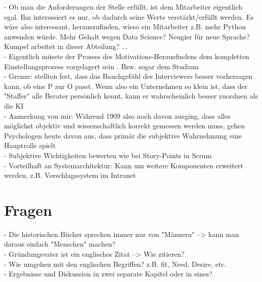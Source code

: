 - Ob man die Anforderungen der Stelle erfüllt, ist dem Mitarbeiter eigentlich egal. Ihn interessiert es nur, ob dadurch seine Werte verstärkt/erfüllt werden. Es wäre also interessant, herauszufinden, wieso ein Mitarbeiter z.B. mehr Python anwenden würde. Mehr Gehalt wegen Data Science? Neugier für neue Sprache? Kumpel arbeitet in dieser Abteilung? ... \\
- Eigentlich müsste der Prozess des Motivations-Herausfindens dem kompletten Einstellungsprozess vorgelagert sein . Bzw. sogar dem Studium \\
- Grenze: \textcite{cable:1997} stellten fest, dass das Bauchgefühl des Interviewers besser vorhersagen kann, ob eine P zur O passt. Wenn also ein Unternehmen so klein ist, dass der "Staffer" alle Berater persönlich kennt, kann er wahrscheinlich besser zuordnen als die KI \\
- Anmerkung von mir: Während \textcite{parsons:1909} 1909 also noch davon ausging, dass alles möglichst objektiv und wissenschaftlich korrekt gemessen werden muss, gehen Psychologen heute davon aus, dass primär die subjektive Wahrnehmung eine Hauptrolle spielt \\
- Subjektive Wichtigkeiten bewerten wie bei Story-Points in Scrum\\
- Vorteilhaft an Systemarchitektur: Kann um weitere Komponenten erweitert werden, z.B. Vorschlagssystem im Intranet

\section{Fragen}
\label{ch:fazit:fragen}
- Die historischen Bücher sprechen immer nur von "Männern" --> kann man daraus einfach "Menschen" machen?\\ 
- Gründungsvater ist ein englisches Zitat --> Wie zitieren?\\ 
- Wie umgehen mit den englischen Begriffen? z.B. fit, Need, Desire, etc. \\
- Ergebnisse und Diskussion in zwei separate Kapitel oder in eines?

